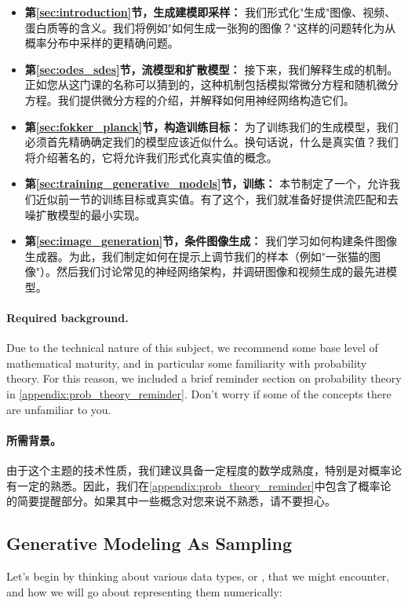 \begin{itemize}
\item \textbf{\sffamily 第\ref{sec:introduction}节，生成建模即采样：} 我们形式化"生成"图像、视频、蛋白质等的含义。我们将例如"如何生成一张狗的图像？"这样的问题转化为从概率分布中采样的更精确问题。
\item \textbf{\sffamily 第\ref{sec:odes_sdes}节，流模型和扩散模型：} 接下来，我们解释生成的机制。正如您从这门课的名称可以猜到的，这种机制包括模拟常微分方程和随机微分方程。我们提供微分方程的介绍，并解释如何用神经网络构造它们。
\item \textbf{\sffamily 第\ref{sec:fokker_planck}节，构造训练目标：} 为了训练我们的生成模型，我们必须首先精确确定我们的模型应该近似什么。换句话说，什么是真实值？我们将介绍著名的，它将允许我们形式化真实值的概念。
\item \textbf{\sffamily 第\ref{sec:training_generative_models}节，训练：} 本节制定了一个，允许我们近似前一节的训练目标或真实值。有了这个，我们就准备好提供流匹配和去噪扩散模型的最小实现。
\item \textbf{\sffamily 第\ref{sec:image_generation}节，条件图像生成：} 我们学习如何构建条件图像生成器。为此，我们制定如何在提示上调节我们的样本（例如"一张猫的图像"）。然后我们讨论常见的神经网络架构，并调研图像和视频生成的最先进模型。
\end{itemize}

\paragraph{Required background.} Due to the technical nature of this subject, we recommend some base level of mathematical maturity, and in particular some familiarity with probability theory. For this reason, we included a brief reminder section on probability theory in \cref{appendix:prob_theory_reminder}. Don't worry if some of the concepts there are unfamiliar to you.

\paragraph{所需背景。} 由于这个主题的技术性质，我们建议具备一定程度的数学成熟度，特别是对概率论有一定的熟悉。因此，我们在\cref{appendix:prob_theory_reminder}中包含了概率论的简要提醒部分。如果其中一些概念对您来说不熟悉，请不要担心。

\subsection{Generative Modeling As Sampling}
\label{subsec:gm_as_sampling}
Let's begin by thinking about various data types, or , that we might encounter, and how we will go about representing them numerically:

